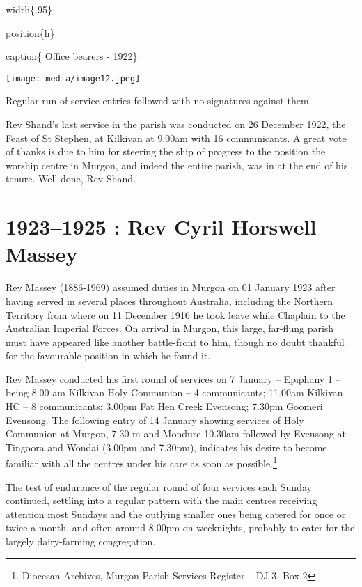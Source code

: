 width\{.95\}

position\{h\}

caption\{ Office bearers - 1922\}

\texttt{[image: media/image12.jpeg]}

Regular run of service entries followed with no signatures against them.

Rev Shand's last service in the parish was conducted on 26 December
1922, the Feast of St Stephen, at Kilkivan at 9.00am with 16
communicants. A great vote of thanks is due to him for steering the ship
of progress to the position the worship centre in Murgon, and indeed the
entire parish, was in at the end of his tenure. Well done, Rev Shand.

\begin{quote}
\end{quote}

\hypertarget{rev-cyril-horswell-massey}{%
\chapter{1923--1925 : Rev Cyril Horswell
Massey}\label{rev-cyril-horswell-massey}}

Rev Massey (1886-1969) assumed duties in Murgon on 01 January 1923 after
having served in several places throughout Australia, including the
Northern Territory from where on 11 December 1916 he took leave while
Chaplain to the Australian Imperial Forces. On arrival in Murgon, this
large, far-flung parish must have appeared like another battle-front to
him, though no doubt thankful for the favourable position in which he
found it.

Rev Massey conducted his first round of services on 7 January --
Epiphany 1 -- being 8.00 am Kilkivan Holy Communion -- 4 communicants;
11.00am Kilkivan HC -- 8 communicants; 3.00pm Fat Hen Creek Evensong;
7.30pm Goomeri Evensong. The following entry of 14 January showing
services of Holy Communion at Murgon, 7.30 m and Mondure 10.30am
followed by Evensong at Tingoora and Wondai (3.00pm and 7.30pm),
indicates his desire to become familiar with all the centres under his
care as soon as possible.\footnote{Diocesan Archives, Murgon Parish
  Services Register -- DJ 3, Box 2}

The test of endurance of the regular round of four services each Sunday
continued, settling into a regular pattern with the main centres
receiving attention most Sundays and the outlying smaller ones being
catered for once or twice a month, and often around 8.00pm on
weeknights, probably to cater for the largely dairy-farming
congregation.

